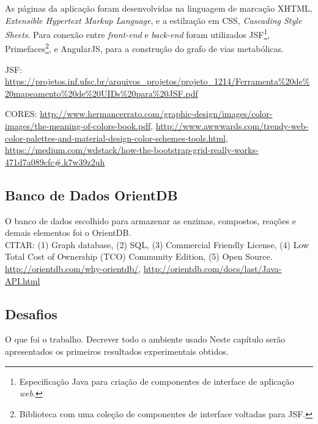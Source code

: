 \indent As páginas da aplicação foram desenvolvidas na linguagem de marcação XHTML, \textit{Extensible Hypertext Markup Language}, e a estilzação em CSS, \textit{Cascading Style Sheets}. Para conexão entre \textit{front-end} e \textit{back-end} foram utilizados JSF\footnote{Especificação Java para criação de componentes de interface de aplicação \textit{web}.}, Primefaces\footnote{Biblioteca com uma coleção de componentes de interface voltadas para JSF.}, e AngularJS, para a construção do grafo de vias metabólicas.

\indent JSF: \url{https://projetos.inf.ufsc.br/arquivos_projetos/projeto_1214/Ferramenta\%20de\%20mapeamento\%20de\%20UIDs\%20para\%20JSF.pdf}

\indent CORES: \url{http://www.hermancerrato.com/graphic-design/images/color-images/the-meaning-of-colors-book.pdf}, \url{http://www.awwwards.com/trendy-web-color-palettes-and-material-design-color-schemes-tools.html}, \url{https://medium.com/wdstack/how-the-bootstrap-grid-really-works-471d7a089cfc#.k7w39z2uh}


\subsection{Banco de Dados OrientDB}

\indent O banco de dados escolhido para armazenar as enzimas, compostos, reações e demais elementos foi o OrientDB.\\
CITAR: (1) Graph database, (2) SQL, (3) Commercial Friendly License, (4) Low Total Cost of Ownership (TCO) Community Edition, (5) Open Source. \url{http://orientdb.com/why-orientdb/}, \url{http://orientdb.com/docs/last/Java-API.html}

\subsection{Desafios}
 
O que foi o trabalho. 
Decrever todo o ambiente usado
Neste capítulo serão apresentados os primeiros resultados experimentais obtidos.